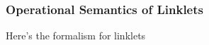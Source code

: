 \subsubsection{Operational Semantics of Linklets}
\label{subsec:linklets-semantics}

Here's the formalism for linklets
